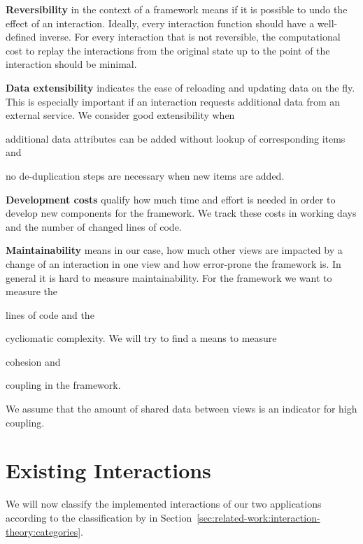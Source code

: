 \textbf{Reversibility} in the context of a \cmv{} framework means if it is possible to undo the effect of an interaction.
Ideally, every interaction function should have a well-defined inverse.
For every interaction that is not reversible, the computational cost to replay the interactions from the original state up to the point of the interaction should be minimal.

\textbf{Data extensibility} indicates the ease of reloading and updating data on the fly.
This is especially important if an interaction requests additional data from an external service.
We consider good extensibility when
\begin{enumerate*}[label=(\arabic*)]
  \item
    additional data attributes can be added without lookup of corresponding items and
  \item
    no de-duplication steps are necessary when new items are added.
\end{enumerate*}

\textbf{Development costs} qualify how much time and effort is needed in order to develop new components for the \cmv{} framework.
We track these costs in working days and the number of changed lines of code.


\textbf{Maintainability} means in our case, how much other views are impacted by a change of an interaction in one view and how error-prone the framework is.
In general it is hard to measure maintainability.
For the \cmv{} framework we want to measure the
\begin{enumerate*}[label=(\arabic*)]
  \item
    lines of code and the
  \item
    cycliomatic complexity. We will try to find a means to measure
  \item
    cohesion and
  \item
    coupling in the framework.
\end{enumerate*}
We assume that the amount of shared data between views is an indicator for high coupling.


\section{Existing Interactions}
We will now classify the implemented interactions of our two applications according to the classification by \textcite{Yi2007} in Section~\ref{sec:related-work:interaction-theory:categories}.

